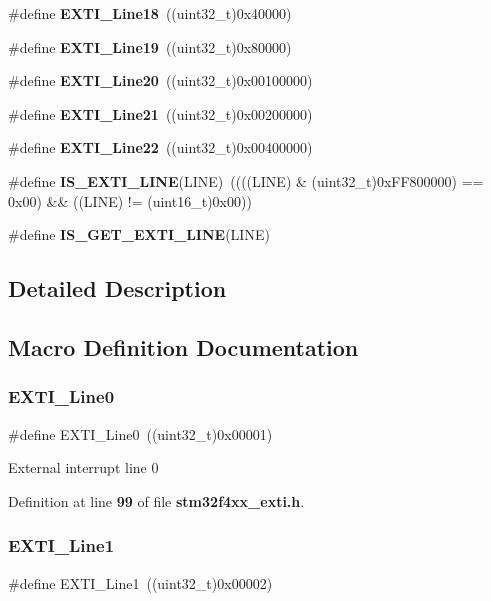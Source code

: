 \begin{DoxyCompactItemize}
\item 
\#define \textbf{ E\+X\+T\+I\+\_\+\+Line18}~((uint32\+\_\+t)0x40000)
\item 
\#define \textbf{ E\+X\+T\+I\+\_\+\+Line19}~((uint32\+\_\+t)0x80000)
\item 
\#define \textbf{ E\+X\+T\+I\+\_\+\+Line20}~((uint32\+\_\+t)0x00100000)
\item 
\#define \textbf{ E\+X\+T\+I\+\_\+\+Line21}~((uint32\+\_\+t)0x00200000)
\item 
\#define \textbf{ E\+X\+T\+I\+\_\+\+Line22}~((uint32\+\_\+t)0x00400000)
\item 
\#define \textbf{ I\+S\+\_\+\+E\+X\+T\+I\+\_\+\+L\+I\+NE}(L\+I\+NE)~((((L\+I\+NE) \& (uint32\+\_\+t)0x\+F\+F800000) == 0x00) \&\& ((\+L\+I\+N\+E) != (uint16\+\_\+t)0x00))
\item 
\#define \textbf{ I\+S\+\_\+\+G\+E\+T\+\_\+\+E\+X\+T\+I\+\_\+\+L\+I\+NE}(L\+I\+NE)
\end{DoxyCompactItemize}


\subsection{Detailed Description}


\subsection{Macro Definition Documentation}
\mbox{\label{group__EXTI__Lines_gac2a65680200dd5f4f7eab29cd4091a75}} 
\subsubsection{E\+X\+T\+I\+\_\+\+Line0}
{\footnotesize\ttfamily \#define E\+X\+T\+I\+\_\+\+Line0~((uint32\+\_\+t)0x00001)}

External interrupt line 0 

Definition at line \textbf{ 99} of file \textbf{ stm32f4xx\+\_\+exti.\+h}.

\mbox{\label{group__EXTI__Lines_gae7c6ab2a0880ce3810641ee0585104cd}} 
\subsubsection{E\+X\+T\+I\+\_\+\+Line1}
{\footnotesize\ttfamily \#define E\+X\+T\+I\+\_\+\+Line1~((uint32\+\_\+t)0x00002)}

